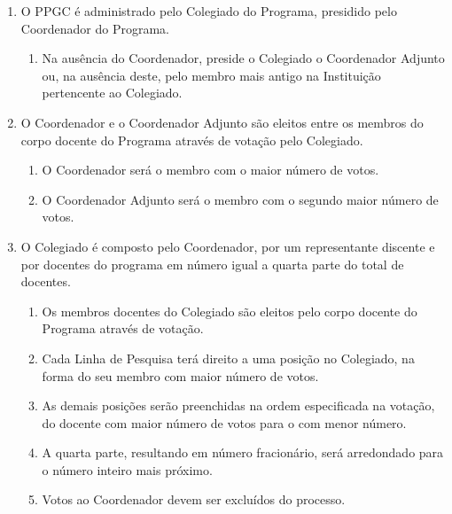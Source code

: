 \documentclass{article}
\begin{document}
\begin{enumerate}

	\item O PPGC é administrado pelo Colegiado do Programa, presidido pelo Coordenador do Programa. 
	\begin{enumerate}
		\item Na ausência do Coordenador, preside o Colegiado o Coordenador Adjunto ou, na ausência deste, pelo membro mais antigo na Instituição pertencente ao Colegiado.
	\end{enumerate}

	\item O Coordenador e o Coordenador Adjunto são eleitos entre os membros do corpo docente do Programa através de votação pelo Colegiado. 
	\begin{enumerate}
		\item O Coordenador será o membro com o maior número de votos.
		\item O Coordenador Adjunto será o membro com o segundo maior número de votos.
	\end{enumerate}

	\item O Colegiado é composto pelo Coordenador, por um representante discente e por docentes do programa em número igual a quarta parte do total de docentes.
	\begin{enumerate}
		\item Os membros docentes do Colegiado são eleitos pelo corpo docente do Programa através de votação.
		\item Cada Linha de Pesquisa terá direito a uma posição no Colegiado, na forma do seu membro com maior número de votos.
		\item As demais posições serão preenchidas na ordem especificada na votação, do docente com maior número de votos para o com menor número.
		\item A quarta parte, resultando em número fracionário, será arredondado para o número inteiro mais próximo.
		\item Votos ao Coordenador devem ser excluídos do processo.
	\end{enumerate}
\end{enumerate}
\end{document}
